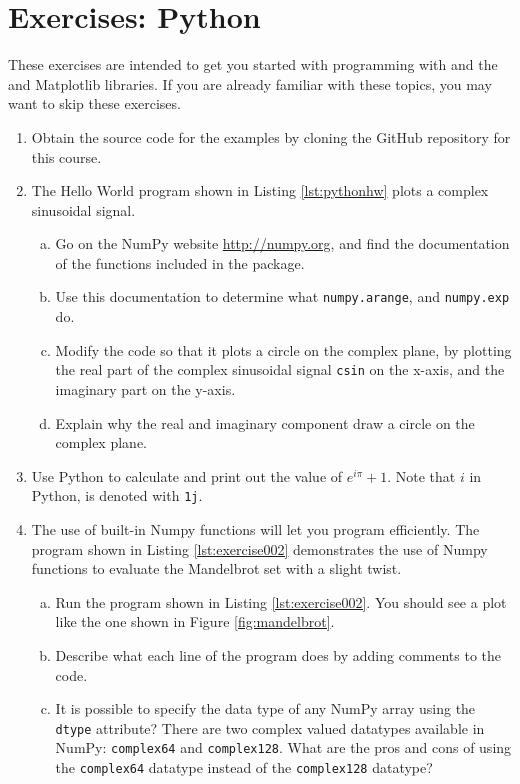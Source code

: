 \newpage
\section{Exercises: Python}

These exercises are intended to get you started with programming with
\emph{} and the \emph{} and
Matplotlib libraries. If you are already familiar with these topics,
you may want to skip these exercises.

\begin{enumerate}
 \item Obtain the source code for the examples by cloning the GitHub
   repository for this course. 
\item The Hello World program shown in Listing \ref{lst:pythonhw} plots a complex sinusoidal signal. 
  \begin{enumerate}[a)]
  \item Go on the NumPy website \url{http://numpy.org}, and find the documentation of the functions included in the package.
  \item Use this documentation to determine what \verb|numpy.arange|, and \verb|numpy.exp| do. 
  \item Modify the code so that it plots a circle on the complex
    plane, by plotting the real part of the complex sinusoidal
    signal \verb|csin| on the x-axis, and the imaginary part on the
    y-axis.
  \item Explain why the real and imaginary component draw a circle on the complex plane.
  \end{enumerate}

\item Use Python to calculate and print out the value of $e^{i \pi} + 1$. Note that $i$ in Python, is denoted
  with \verb|1j|.
  
\item The use of built-in Numpy functions will let you program
  efficiently. The program shown in Listing \ref{lst:exercise002}
  demonstrates the use of Numpy functions to evaluate the Mandelbrot
  set with a slight twist.



\begin{enumerate}[a)]
  \item Run the program shown in Listing \ref{lst:exercise002}. You
    	should see a plot like the one shown in Figure \ref{fig:mandelbrot}.
  \item Describe what each line of the program does by adding comments to the code.
  \item It is possible to specify the data type of any NumPy array
      	using the \verb|dtype| attribute? There are two complex valued
      	datatypes available in NumPy: \verb|complex64| and \verb|complex128|. 
      	What are the pros and cons of using the \verb|complex64| datatype 
      	instead of the \verb|complex128| datatype? 
\end{enumerate}



\end{enumerate}
